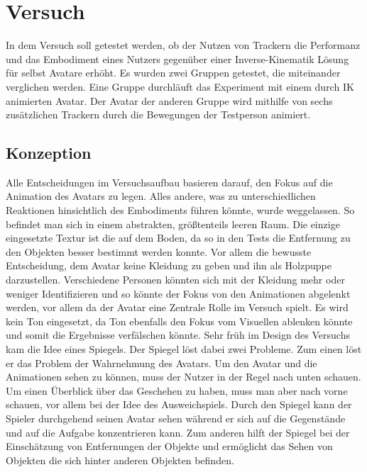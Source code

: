 \chapter{Versuch}
In dem Versuch soll getestet werden, ob der Nutzen von Trackern die Performanz und das Embodiment eines Nutzers gegenüber einer Inverse-Kinematik Lösung für selbst Avatare erhöht. Es wurden zwei Gruppen getestet, die miteinander verglichen werden. Eine Gruppe durchläuft das Experiment mit einem durch IK animierten Avatar. Der Avatar der anderen Gruppe wird mithilfe von sechs zusätzlichen Trackern durch die Bewegungen der Testperson animiert.


\section{Konzeption}
Alle Entscheidungen im Versuchsaufbau basieren darauf, den Fokus auf die Animation des Avatars zu legen. Alles andere, was zu unterschiedlichen Reaktionen hinsichtlich des Embodiments führen könnte, wurde weggelassen. So befindet man sich in einem abstrakten, größtenteils leeren Raum. Die einzige eingesetzte Textur ist die auf dem Boden, da so in den Tests die Entfernung zu den Objekten besser bestimmt werden konnte. Vor allem die bewusste Entscheidung, dem Avatar keine Kleidung zu geben und ihn als Holzpuppe darzustellen. Verschiedene Personen könnten sich mit der Kleidung mehr oder weniger Identifizieren und so könnte der Fokus von den Animationen abgelenkt werden, vor allem da der Avatar eine Zentrale Rolle im Versuch spielt.
Es wird kein Ton eingesetzt, da Ton ebenfalls den Fokus vom Visuellen ablenken könnte und somit die Ergebnisse verfälschen könnte.
Sehr früh im Design des Versuchs kam die Idee eines Spiegels. Der Spiegel löst dabei zwei Probleme. Zum einen löst er das Problem der Wahrnehmung des Avatars. Um den Avatar und die Animationen sehen zu können, muss der Nutzer in der Regel nach unten schauen. Um einen Überblick über das Geschehen zu haben, muss man aber nach vorne schauen, vor allem bei der Idee des Ausweichspiels. Durch den Spiegel kann der Spieler durchgehend seinen Avatar sehen während er sich auf die Gegenstände und auf die Aufgabe konzentrieren kann. Zum anderen hilft der Spiegel bei der Einschätzung von Entfernungen der Objekte und ermöglicht das Sehen von Objekten die sich hinter anderen Objekten befinden.

